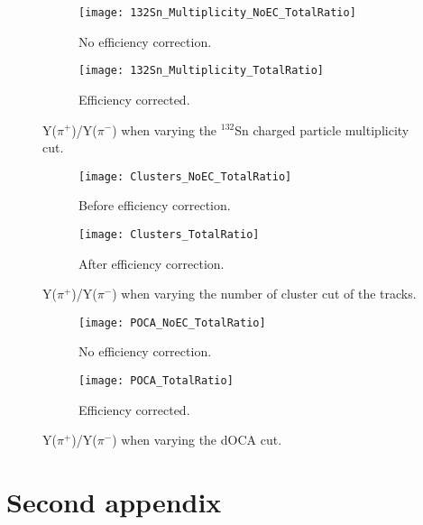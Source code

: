 \begin{figure}[!htb]
     \centering
     \begin{subfigure}[b]{\textwidth}
         \centering
         \texttt{[image: 132Sn\_Multiplicity\_NoEC\_TotalRatio]}
         \caption{No efficiency correction.}
         \label{fig:ratio_multCutVar_NoEC}
     \end{subfigure}
     \hfill
    \begin{subfigure}[b]{\textwidth}
         \centering
         \texttt{[image: 132Sn\_Multiplicity\_TotalRatio]}
         \caption{Efficiency corrected.}
         \label{fig:ratio_multCutVar}
     \end{subfigure}
     \hfill
\caption{Y($\pi^+$)/Y($\pi^-$) when varying the ${}^{132}$Sn charged particle multiplicity cut. }
\label{fig:ratio_multCutVar}
\end{figure}



\begin{figure}[!htb]
     \centering
     \begin{subfigure}[b]{\textwidth}
         \centering
         \texttt{[image: Clusters\_NoEC\_TotalRatio]}
         \caption{Before efficiency correction.}
         \label{fig:ratio_clustVar_NoEC}
     \end{subfigure}
     \hfill
    \begin{subfigure}[b]{\textwidth}
         \centering
         \texttt{[image: Clusters\_TotalRatio]}
         \caption{After efficiency correction.}
         \label{fig:ratio_clustVar_EC}
     \end{subfigure}
     \hfill
\caption{Y($\pi^+$)/Y($\pi^-$) when varying the number of cluster cut of the tracks.}
\label{fig:ratio_clustVar}
\end{figure}




\begin{figure}[!htb]
     \centering
     \begin{subfigure}[b]{\textwidth}
         \centering
         \texttt{[image: POCA\_NoEC\_TotalRatio]}
         \caption{No efficiency correction.}
         \label{fig:ratio_cutVarPOCA_NoEC}
     \end{subfigure}
     \hfill
    \begin{subfigure}[b]{\textwidth}
         \centering
         \texttt{[image: POCA\_TotalRatio]}
         \caption{Efficiency corrected.}
         \label{fig:ratio_cutVarPOCA_EC}
     \end{subfigure}
     \hfill
\caption{Y($\pi^+$)/Y($\pi^-$) when varying the dOCA cut.}
\label{fig:ratio_cutVarPOCA}
\end{figure}


\chapter{Second appendix}


